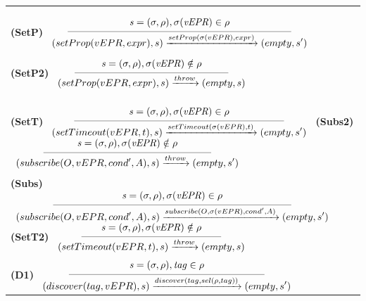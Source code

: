 \begin{table}[!h]
{{\begin{tabular}{l}
\textbf{(SetP)}\hspace{-0.2cm}
$\reglaa{ %
{\it s=(\sigma,\rho), \sigma(vEPR) \in \rho}
}
{ %
(setProp(vEPR,expr),s)
\xrightarrow{setProp(\sigma(vEPR),expr)}
(empty,s')
}{8}$

\hspace{0.1cm}\textbf{(SetP2)}\hspace{-0.2cm}
$\reglaa{ %
{\it s=(\sigma,\rho), \sigma(vEPR) \notin \rho}
}
{ %
(setProp(vEPR,expr),s)
\xrightarrow{throw}
(empty,s)
}{5.5}$
\\
\hspace{0.1cm}{\tiny where  ${\it vEPR \in VAR}$ and ${\it s'=(\sigma,\rho[expr/vEPR]_1)}$.}\\[0.2cm]
\textbf{(SetT)}\hspace{-0.2cm}
$\reglaa{ %
{\it s=(\sigma,\rho), \sigma(vEPR) \in \rho}
}
{ %
(setTimeout(vEPR,t), s)
\xrightarrow{setTimeout(\sigma(vEPR),t)}
(empty,s')
}{7.5}$
\hspace{-0.1cm}\textbf{(Subs2)}\hspace{-0.4cm}
$\reglaa{ %
{\it s=(\sigma,\rho), \sigma(vEPR) \notin \rho}
}
{ %
(subscribe(O,vEPR,cond',A),s)
\xrightarrow{throw}
(empty,s')
}{6}$\\
\hspace{0.1cm}{\tiny where  ${\it t\geq1}$,$\ {\it s'=(\sigma,\rho[t/vEPR]_2)}$.}
\\[0.2cm]


\textbf{(Subs)}\hspace{-0.6cm}
$\reglaa{ %
{\it s=(\sigma,\rho), \sigma(vEPR) \in \rho}
}
{ %
(subscribe(O,vEPR,cond',A),s)
\xrightarrow{subscribe(O,\sigma(vEPR),cond',A)}
(empty,s')
}{8.5}$
\hspace{-0.3cm}\textbf{(SetT2)}\hspace{-0.5cm}
$\reglaa{ %
{\it s=(\sigma,\rho), \sigma(vEPR)\notin \rho}
}
{ %
(setTimeout(vEPR,t), s)
\xrightarrow{throw}
(empty,s)
}{5}$
\\
\hspace{0.1cm}{\tiny where ${\it s'=(\sigma,Add\_subs(\rho,vEPR,O,cond',A))}$}
\\[0.2cm]

\textbf{(D1)}\hspace{-0.3cm}
$\reglaa{ %
{\it s=(\sigma,\rho), tag \in \rho}
}
{ %
(discover(tag,vEPR),s)
\xrightarrow{discover(tag,sel(\rho,tag))}
(empty,s')
}{7}$


\end{tabular}}}
\end{table}
